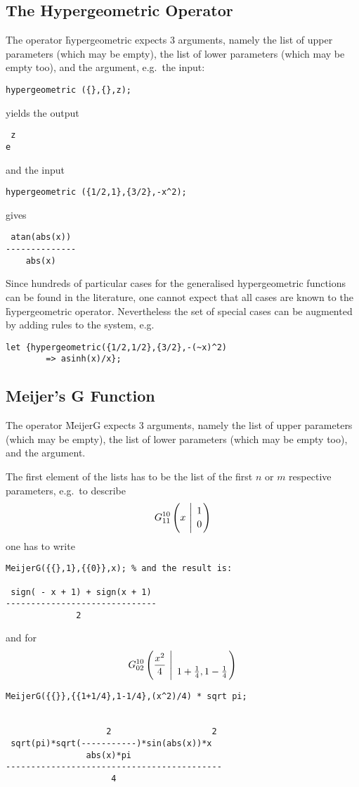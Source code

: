 \hypertarget{operator:HYPERGEOMETRIC}{}
\subsection{The Hypergeometric Operator}

The operator \f{hypergeometric} expects 3 arguments, namely the 
list of upper parameters (which may be empty), the list of lower
parameters (which may be empty too), and the argument, e.g.\ the input:
\begin{verbatim}
hypergeometric ({},{},z);
\end{verbatim}
yields the output
\begin{verbatim}
 z
e
\end{verbatim}
and the input
\begin{verbatim}
hypergeometric ({1/2,1},{3/2},-x^2);
\end{verbatim}
gives
\begin{verbatim}
 atan(abs(x))
--------------
    abs(x)
\end{verbatim}


Since hundreds of particular cases for the generalised hypergeometric
functions can be found in the literature, one cannot expect that all
cases are known to the \f{hypergeometric} operator.
Nevertheless the set of special cases can be augmented by adding
rules to the \REDUCE{} system, e.g.
\begin{verbatim}
let {hypergeometric({1/2,1/2},{3/2},-(~x)^2)
        => asinh(x)/x};
\end{verbatim}

\subsection{Meijer's G Function}
\hypertarget{operator:MEIJERG}{}

The operator \f{MeijerG} expects 3 arguments, namely the 
list of upper parameters (which may be empty), the list of lower
parameters (which may be empty too), and the argument.

The first element of the lists has to be the list of the
first $n$ or $m$ respective parameters, e.g.\ to describe 
\[
G_{1 1}^{1 0} \left( x \  \Bigg\vert \  \genfrac{}{}{0pt}{}{1}{0} \right)
\]
one has to write 
\begin{verbatim}
MeijerG({{},1},{{0}},x); % and the result is:

 sign( - x + 1) + sign(x + 1)
------------------------------
              2
\end{verbatim}
and for
\[
G_{0 2}^{1 0} \left( \frac{x^2}{4} \  \Bigg\vert \ \genfrac{}{}{0pt}{}{}{{1+ \frac{1}{4} },
{1-\frac{1}{4}}} \right)
\]
\begin{verbatim}
MeijerG({{}},{{1+1/4},1-1/4},(x^2)/4) * sqrt pi;


                    2                    2
 sqrt(pi)*sqrt(-----------)*sin(abs(x))*x
                abs(x)*pi
-------------------------------------------
                     4
\end{verbatim}

